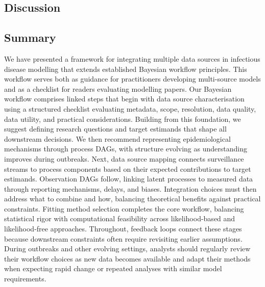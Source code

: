 \documentclass{article}
\begin{document}
\begin{enumerate}
\section{Discussion}

\subsection{Summary}

We have presented a framework for integrating multiple data sources in infectious disease modelling that extends established Bayesian workflow principles.
This workflow serves both as guidance for practitioners developing multi-source models and as a checklist for readers evaluating modelling papers.
Our Bayesian workflow comprises linked steps that begin with data source characterisation using a structured checklist evaluating metadata, scope, resolution, data quality, data utility, and practical considerations.
Building from this foundation, we suggest defining research questions and target estimands that shape all downstream decisions.
We then recommend representing epidemiological mechanisms through process DAGs, with structure evolving as understanding improves during outbreaks.
Next, data source mapping connects surveillance streams to process components based on their expected contributions to target estimands.
Observation DAGs follow, linking latent processes to measured data through reporting mechanisms, delays, and biases.
Integration choices must then address what to combine and how, balancing theoretical benefits against practical constraints.
Fitting method selection completes the core workflow, balancing statistical rigor with computational feasibility across likelihood-based and likelihood-free approaches.
Throughout, feedback loops connect these stages because downstream constraints often require revisiting earlier assumptions.
During outbreaks and other evolving settings, analysts should regularly review their workflow choices as new data becomes available and adapt their methods when expecting rapid change or repeated analyses with similar model requirements.


\end{enumerate}
\end{document}
